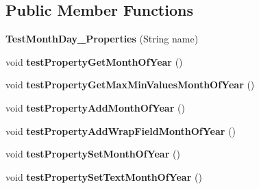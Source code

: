 \subsection*{Public Member Functions}
\begin{DoxyCompactItemize}
\item 
\hypertarget{classorg_1_1joda_1_1time_1_1_test_month_day___properties_a67b482247023334764cc34d1d210d1fa}{{\bfseries Test\-Month\-Day\-\_\-\-Properties} (String name)}\label{classorg_1_1joda_1_1time_1_1_test_month_day___properties_a67b482247023334764cc34d1d210d1fa}

\item 
\hypertarget{classorg_1_1joda_1_1time_1_1_test_month_day___properties_a0dc842a1629ed951540457d383919ba1}{void {\bfseries test\-Property\-Get\-Month\-Of\-Year} ()}\label{classorg_1_1joda_1_1time_1_1_test_month_day___properties_a0dc842a1629ed951540457d383919ba1}

\item 
\hypertarget{classorg_1_1joda_1_1time_1_1_test_month_day___properties_acc0515db4f1a1f449d5c2310c78fedd0}{void {\bfseries test\-Property\-Get\-Max\-Min\-Values\-Month\-Of\-Year} ()}\label{classorg_1_1joda_1_1time_1_1_test_month_day___properties_acc0515db4f1a1f449d5c2310c78fedd0}

\item 
\hypertarget{classorg_1_1joda_1_1time_1_1_test_month_day___properties_a51420539768c2dfacc26cca4e60a3671}{void {\bfseries test\-Property\-Add\-Month\-Of\-Year} ()}\label{classorg_1_1joda_1_1time_1_1_test_month_day___properties_a51420539768c2dfacc26cca4e60a3671}

\item 
\hypertarget{classorg_1_1joda_1_1time_1_1_test_month_day___properties_a061fccf72c56adda320e661416b7ebcf}{void {\bfseries test\-Property\-Add\-Wrap\-Field\-Month\-Of\-Year} ()}\label{classorg_1_1joda_1_1time_1_1_test_month_day___properties_a061fccf72c56adda320e661416b7ebcf}

\item 
\hypertarget{classorg_1_1joda_1_1time_1_1_test_month_day___properties_a1f0143f3d01a45d768af73c903426d08}{void {\bfseries test\-Property\-Set\-Month\-Of\-Year} ()}\label{classorg_1_1joda_1_1time_1_1_test_month_day___properties_a1f0143f3d01a45d768af73c903426d08}

\item 
\hypertarget{classorg_1_1joda_1_1time_1_1_test_month_day___properties_affb442d65cf31269159a065a085d0877}{void {\bfseries test\-Property\-Set\-Text\-Month\-Of\-Year} ()}\label{classorg_1_1joda_1_1time_1_1_test_month_day___properties_affb442d65cf31269159a065a085d0877}


\end{DoxyCompactItemize}

